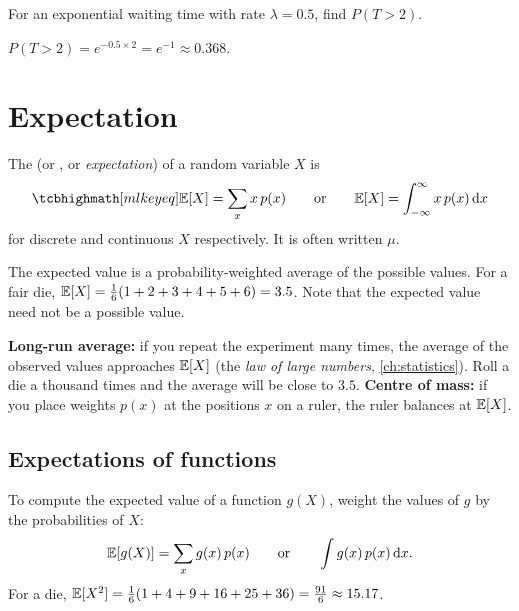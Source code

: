 \begin{exercise}
For an exponential waiting time with rate $\lambda = 0.5$, find $P(T > 2)$.
\end{exercise}
\begin{solution}
$P(T > 2) = e^{-0.5\times2} = e^{-1} \approx 0.368$.
\end{solution}

\section{Expectation}\label{sec:expectation}

\begin{definition}\label{def:expectation}
The  (or , or \emph{expectation}) of a random
variable $X$ is
\[
  \keyeq{\E[X] = \sum_x x\,p(x)}
  \qquad\text{or}\qquad
  \E[X] = \int_{-\infty}^{\infty}x\,p(x)\,\dd x
\]
for discrete and continuous $X$ respectively. It is often written $\mu$.
\end{definition}

The expected value is a probability-weighted average of the possible values.
For a fair die, $\mathbb{E}[X] = \frac16(1 + 2 + 3 + 4 + 5 + 6) = 3.5$. Note that the
expected value need not be a possible value.

\begin{intuition}
\textbf{Long-run average:} if you repeat the experiment many times, the average
of the observed values approaches $\mathbb{E}[X]$ (the \emph{law of large numbers},
\cref{ch:statistics}). Roll a die a thousand times and the average will be close
to $3.5$. \textbf{Centre of mass:} if you place weights $p(x)$ at the positions
$x$ on a ruler, the ruler balances at $\mathbb{E}[X]$.
\end{intuition}

\subsection{Expectations of functions}

To compute the expected value of a function $g(X)$, weight the values of $g$ by
the probabilities of $X$:
\[
  \mathbb{E}[g(X)] = \sum_x g(x)\,p(x)
  \qquad\text{or}\qquad \int g(x)\,p(x)\,\mathrm{d} x .
\]
For a die, $\mathbb{E}[X^2] = \frac16(1 + 4 + 9 + 16 + 25 + 36) = \frac{91}{6} \approx
15.17$.

